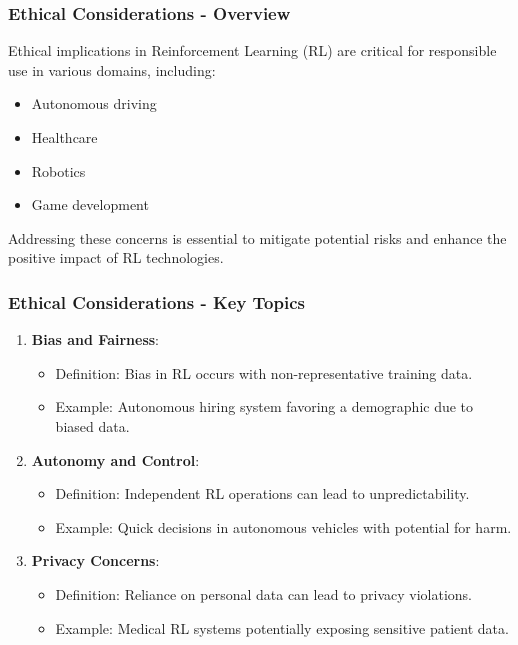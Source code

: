 \documentclass{beamer}
\begin{document}
\begin{frame}[fragile]
    \frametitle{Ethical Considerations - Overview}
    Ethical implications in Reinforcement Learning (RL) are critical for responsible use in various domains, including:
    \begin{itemize}
        \item Autonomous driving
        \item Healthcare
        \item Robotics
        \item Game development
    \end{itemize}
    Addressing these concerns is essential to mitigate potential risks and enhance the positive impact of RL technologies.
\end{frame}

\begin{frame}[fragile]
    \frametitle{Ethical Considerations - Key Topics}
    \begin{enumerate}
        \item \textbf{Bias and Fairness}:
        \begin{itemize}
            \item Definition: Bias in RL occurs with non-representative training data.
            \item Example: Autonomous hiring system favoring a demographic due to biased data.
        \end{itemize}
        
        \item \textbf{Autonomy and Control}:
        \begin{itemize}
            \item Definition: Independent RL operations can lead to unpredictability.
            \item Example: Quick decisions in autonomous vehicles with potential for harm.
        \end{itemize}
        
        \item \textbf{Privacy Concerns}:
        \begin{itemize}
            \item Definition: Reliance on personal data can lead to privacy violations.
            \item Example: Medical RL systems potentially exposing sensitive patient data.
        \end{itemize}
    \end{enumerate}
\end{frame}
\end{document}
